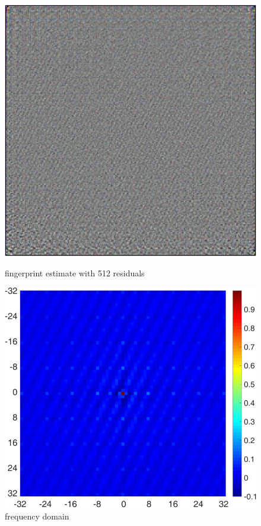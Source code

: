 \documentclass[fleqn,compress,utf8,aspectratio=169,t,handout]{beamer}
\begin{document}
\begin{frame}
	\begin{figure}[h]
    \centering
    \begin{minipage}{0.45\textwidth}
      \includegraphics[width = 0.8 \textwidth]{figs/ProGAN_Kitchen_F512.jpg}
      \caption{fingerprint estimate with 512 residuals}
    \end{minipage}
    \hfill
    \pause
		\begin{minipage}{0.45\textwidth}
      \includegraphics[width = 0.9 \textwidth]{figs/ProGAN_Kitchen_F512_autocorrelation.png}
      \caption{frequency domain}
    \end{minipage}
	\end{figure}
\end{frame}
\end{document}

